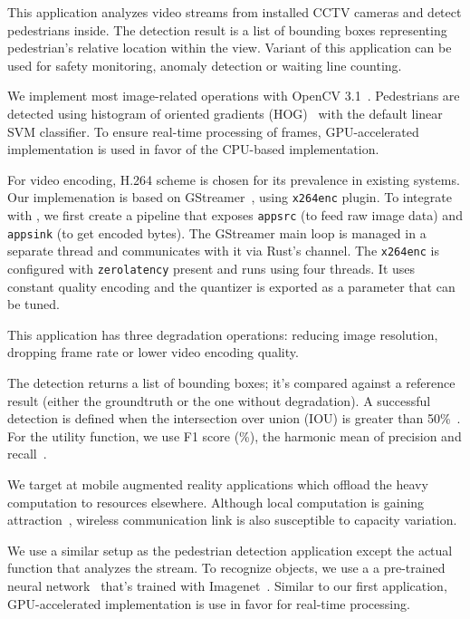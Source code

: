  This application analyzes video streams from
installed CCTV cameras and detect pedestrians inside. The detection result is a
list of bounding boxes representing pedestrian's relative location within the
view. Variant of this application can be used for safety monitoring, anomaly
detection or waiting line counting.

We implement most image-related operations with OpenCV
3.1~\cite{opencvlibrary}. Pedestrians are detected using histogram of oriented
gradients (HOG)~\cite{dalal2005histograms} with the default linear SVM
classifier. To ensure real-time processing of frames, GPU-accelerated
implementation is used in favor of the CPU-based implementation.

For video encoding, H.264 scheme is chosen for its prevalence in existing
systems. Our implemenation is based on GStreamer~\cite{gstreamer}, using
\texttt{x264enc} plugin. To integrate with \sysname{}, we first create a
pipeline that exposes \texttt{appsrc} (to feed raw image data) and
\texttt{appsink} (to get encoded bytes). The GStreamer main loop is managed in a
separate thread and \sysname{} communicates with it via Rust's channel. The
\texttt{x264enc} is configured with \texttt{zerolatency} present and runs using
four threads. It uses constant quality encoding and the quantizer is exported as
a parameter that can be tuned.

This application has three degradation operations: reducing image resolution,
dropping frame rate or lower video encoding quality.

The detection returns a list of bounding boxes; it's compared against a
reference result (either the groundtruth or the one without degradation). A
successful detection is defined when the intersection over union (IOU) is
greater than 50\%~\cite{everingham2010pascal}. For the utility function, we use
F1 score (\%), the harmonic mean of precision and
recall~\cite{Rijsbergen:1979:IR:539927}.

 We target at mobile augmented reality applications
which offload the heavy computation to resources elsewhere. Although local
computation is gaining attraction~\cite{satyanarayanan2009case, zhang2015cloud},
wireless communication link is also susceptible to capacity variation.

We use a similar setup as the pedestrian detection application except the actual
function that analyzes the stream. To recognize objects, we use a a pre-trained
neural network~\cite{darknet13} that's trained with
Imagenet~\cite{krizhevsky2012imagenet}. Similar to our first application,
GPU-accelerated implementation is use in favor for real-time processing.

